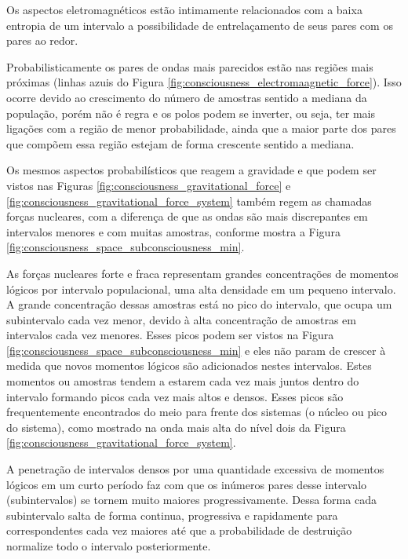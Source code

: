 Os aspectos eletromagnéticos estão intimamente relacionados com a baixa entropia de um intervalo a possibilidade de entrelaçamento de seus pares com os pares ao redor.

Probabilisticamente os pares de ondas mais parecidos estão nas regiões mais próximas (linhas azuis do Figura \ref{fig:consciousness_electromaagnetic_force}). Isso ocorre devido ao crescimento do número de amostras sentido a mediana da população, porém não é regra e os polos podem se inverter, ou seja, ter mais ligações com a região de menor probabilidade, ainda que a maior parte dos pares que compõem essa região estejam de forma crescente sentido a mediana.

Os mesmos aspectos probabilísticos que reagem a gravidade e que podem ser vistos nas Figuras \ref{fig:consciousness_gravitational_force} e \ref{fig:consciousness_gravitational_force_system} também regem as chamadas forças nucleares, com a diferença de que as ondas são mais discrepantes em intervalos menores e com muitas amostras, conforme mostra a Figura \ref{fig:consciousness_space_subconsciousness_min}.

As forças nucleares forte e fraca representam grandes concentrações de momentos lógicos por intervalo populacional, uma alta densidade em um pequeno intervalo. A grande concentração dessas amostras está no pico do intervalo, que ocupa um subintervalo cada vez menor, devido à alta concentração de amostras em intervalos cada vez menores. Esses picos podem ser vistos na Figura \ref{fig:consciousness_space_subconsciousness_min} e eles não param de crescer à medida que novos momentos lógicos são adicionados nestes intervalos. Estes momentos ou amostras tendem a estarem cada vez mais juntos dentro do intervalo formando picos cada vez mais altos e densos. Esses picos são frequentemente encontrados do meio para frente dos sistemas (o núcleo ou pico do sistema), como mostrado na onda mais alta do nível dois da Figura \ref{fig:consciousness_gravitational_force_system}.

A penetração de intervalos densos por uma quantidade excessiva de momentos lógicos em um curto período faz com que os inúmeros pares desse intervalo (subintervalos) se tornem muito maiores progressivamente. Dessa forma cada subintervalo salta de forma continua, progressiva e rapidamente para correspondentes cada vez maiores até que a probabilidade de destruição normalize todo o intervalo posteriormente.

